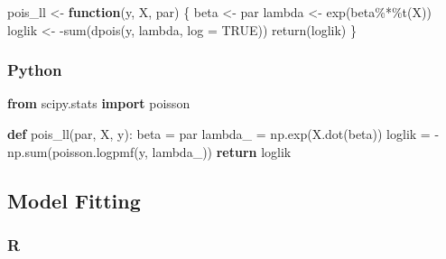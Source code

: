\documentclass[
  letterpaper,
]{krantz}
\newenvironment{Shaded}{}{}
\newcommand{\AttributeTok}[1]{\textcolor[rgb]{0.49,0.56,0.16}{#1}}
\newcommand{\BuiltInTok}[1]{\textcolor[rgb]{0.00,0.50,0.00}{#1}}
\newcommand{\ConstantTok}[1]{\textcolor[rgb]{0.53,0.00,0.00}{#1}}
\newcommand{\ControlFlowTok}[1]{\textcolor[rgb]{0.00,0.44,0.13}{\textbf{#1}}}
\newcommand{\FunctionTok}[1]{\textcolor[rgb]{0.02,0.16,0.49}{#1}}
\newcommand{\ImportTok}[1]{\textcolor[rgb]{0.00,0.50,0.00}{\textbf{#1}}}
\newcommand{\KeywordTok}[1]{\textcolor[rgb]{0.00,0.44,0.13}{\textbf{#1}}}
\newcommand{\NormalTok}[1]{#1}
\newcommand{\OperatorTok}[1]{\textcolor[rgb]{0.40,0.40,0.40}{#1}}
\newcommand{\OtherTok}[1]{\textcolor[rgb]{0.00,0.44,0.13}{#1}}
\newcommand{\SpecialCharTok}[1]{\textcolor[rgb]{0.25,0.44,0.63}{#1}}
\begin{document}
\begin{Shaded}
\begin{Highlighting}[]
\NormalTok{pois\_ll }\OtherTok{\textless{}{-}} \ControlFlowTok{function}\NormalTok{(y, X, par) \{}
\NormalTok{  beta }\OtherTok{\textless{}{-}}\NormalTok{ par}
\NormalTok{  lambda }\OtherTok{\textless{}{-}} \FunctionTok{exp}\NormalTok{(beta}\SpecialCharTok{\%*\%}\FunctionTok{t}\NormalTok{(X))}
\NormalTok{  loglik }\OtherTok{\textless{}{-}} \SpecialCharTok{{-}}\FunctionTok{sum}\NormalTok{(}\FunctionTok{dpois}\NormalTok{(y, lambda, }\AttributeTok{log =} \ConstantTok{TRUE}\NormalTok{))}
  \FunctionTok{return}\NormalTok{(loglik)}
\NormalTok{\}}
\end{Highlighting}
\end{Shaded}

\subsubsection{Python}

\begin{Shaded}
\begin{Highlighting}[]
\ImportTok{from}\NormalTok{ scipy.stats }\ImportTok{import}\NormalTok{ poisson}

\KeywordTok{def}\NormalTok{ pois\_ll(par, X, y):}
\NormalTok{    beta }\OperatorTok{=}\NormalTok{ par}
\NormalTok{    lambda\_ }\OperatorTok{=}\NormalTok{ np.exp(X.dot(beta))}
\NormalTok{    loglik }\OperatorTok{=} \OperatorTok{{-}}\NormalTok{np.}\BuiltInTok{sum}\NormalTok{(poisson.logpmf(y, lambda\_))}
    \ControlFlowTok{return}\NormalTok{ loglik}
\end{Highlighting}
\end{Shaded}

\subsection{Model Fitting}\label{model-fitting-1}

\subsubsection{R}
\end{document}

